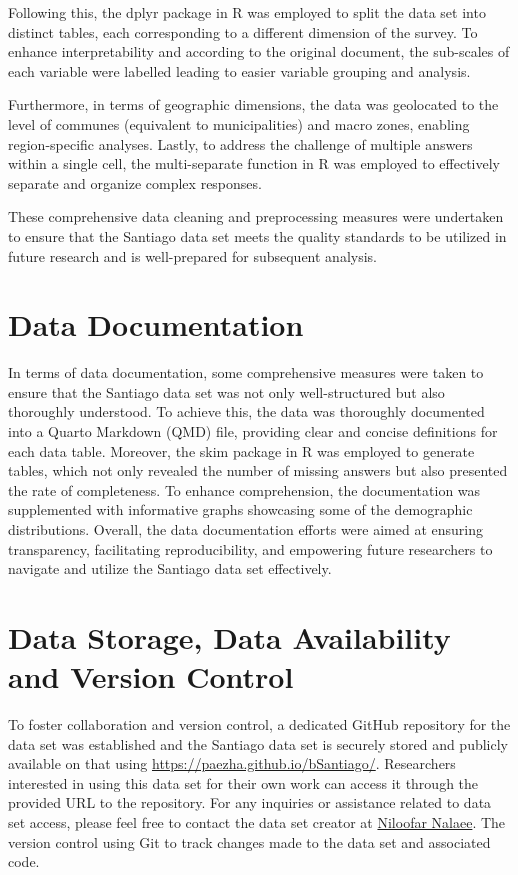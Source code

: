 \documentclass[
11pt, %
oneside, %
english, %
singlespacing, %
]{macthesis} %
\begin{document}
Following this, the dplyr package in R was employed to split the data set into distinct tables, each corresponding to a different dimension of the survey. To enhance interpretability and according to the original document, the sub-scales of each variable were labelled leading to easier variable grouping and analysis.

Furthermore, in terms of geographic dimensions, the data was geolocated to the level of communes (equivalent to municipalities) and macro zones, enabling region-specific analyses. Lastly, to address the challenge of multiple answers within a single cell, the multi-separate function in R was employed to effectively separate and organize complex responses.

These comprehensive data cleaning and preprocessing measures were undertaken to ensure that the Santiago data set meets the quality standards to be utilized in future research and is well-prepared for subsequent analysis.

\hypertarget{data-documentation}{%
\section{Data Documentation}\label{data-documentation}}

In terms of data documentation, some comprehensive measures were taken to ensure that the Santiago data set was not only well-structured but also thoroughly understood. To achieve this, the data was thoroughly documented into a Quarto Markdown (QMD) file, providing clear and concise definitions for each data table. Moreover, the skim package in R was employed to generate tables, which not only revealed the number of missing answers but also presented the rate of completeness. To enhance comprehension, the documentation was supplemented with informative graphs showcasing some of the demographic distributions. Overall, the data documentation efforts were aimed at ensuring transparency, facilitating reproducibility, and empowering future researchers to navigate and utilize the Santiago data set effectively.

\hypertarget{data-storage-data-availability-and-version-control}{%
\section{Data Storage, Data Availability and Version Control}\label{data-storage-data-availability-and-version-control}}

To foster collaboration and version control, a dedicated GitHub repository for the data set was established and the Santiago data set is securely stored and publicly available on that using \url{https://paezha.github.io/bSantiago/}. Researchers interested in using this data set for their own work can access it through the provided URL to the repository. For any inquiries or assistance related to data set access, please feel free to contact the data set creator at \href{niloofar.nalaee@gmail.com}{Niloofar Nalaee}. The version control using Git to track changes made to the data set and associated code.
\end{document}
